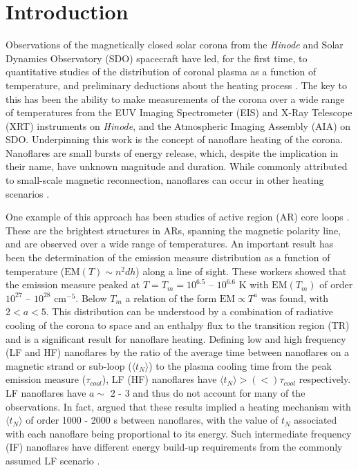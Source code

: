 \documentclass[]{aastex}
\begin{document}
	\section{Introduction}
	\label{sec:intro}
	\par Observations of the magnetically closed solar corona from the \textit{Hinode} \citep{kosugi_hinode_2007} and Solar Dynamics Observatory (SDO) \citep{pesnell_solar_2012} spacecraft have led, for the first time, to quantitative studies of the distribution of coronal plasma as a function of temperature, and preliminary deductions about the heating process \citep[see papers in][]{de_moortel_recent_2015}. The key to this has been the ability to make measurements of the corona over a wide range of temperatures from the EUV Imaging Spectrometer (EIS) \citep{culhane_euv_2007} and X-Ray Telescope (XRT) \citep{golub_x-ray_2007} instruments on \textit{Hinode}, and the Atmospheric Imaging Assembly (AIA) \citep{lemen_atmospheric_2012} on SDO. Underpinning this work is the concept of nanoflare heating of the corona. Nanoflares \citep[e.g.][]{parker_nanoflares_1988} are small bursts of energy release, which, despite the implication in their name, have unknown magnitude and duration. While commonly attributed to small-scale magnetic reconnection, nanoflares can occur in other heating scenarios \citep[e.g.][]{ofman_self-consistent_1998}.
%
	\par One example of this approach has been studies of active region (AR) core loops \citep{warren_constraints_2011,warren_systematic_2012,winebarger_using_2011,tripathi_emission_2011,schmelz_cold_2012,bradshaw_diagnosing_2012,reep_diagnosing_2013,del_zanna_evolution_2015}. These are the brightest structures in ARs, spanning the magnetic polarity line, and are observed over a wide range of temperatures. An important result has been the determination of the emission measure distribution as a function of temperature ($\mathrm{EM}(T)\sim n^2dh$) along a line of sight. These workers showed that the emission measure peaked at $T = T_m = 10^{6.5}$ – $10^{6.6}$ K with $\mathrm{EM}(T_m)$ of order $10^{27}$ – $10^{28}$ cm$^{-5}$.  Below $T_m$ a relation of the form $\mathrm{EM} \propto T^a$ was found, with $2 < a < 5$. This distribution can be understood by a combination of radiative cooling of the corona to space and an enthalpy flux to the transition region (TR) \citep[e.g.][]{bradshaw_cooling_2010,bradshaw_new_2010} and is a significant result for nanoflare heating. Defining low and high frequency (LF and HF) nanoflares by the ratio of the average time between nanoflares on a magnetic strand or sub-loop ($\langle t_N \rangle$) to the plasma cooling time from the peak emission measure ($\tau_{cool}$), LF (HF) nanoflares have $\langle t_N \rangle > (<) \tau_{cool}$ respectively. LF nanoflares have $a \sim$ 2 - 3 and thus do not account for many of the observations. In fact, \citet{cargill_active_2014} argued that these results implied a heating mechanism with $\langle t_N \rangle$ of order 1000 - 2000 s between nanoflares, with the value of $t_N$ associated with each nanoflare being proportional to its energy. Such intermediate frequency (IF) nanoflares have different energy build-up requirements from the commonly assumed LF scenario \citep{cargill_active_2014}.  
\end{document}
